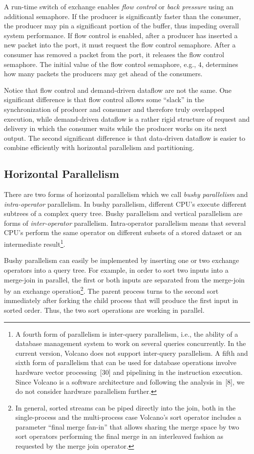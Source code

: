 \documentclass[a4paper,12pt,notitlepage,twoside,openright]{article}
\begin{document}
A run-time switch of exchange enables \emph{flow control}
or \emph{back pressure} using an additional semaphore. If the
producer is significantly faster than the consumer, the producer
may pin a significant portion of the buffer, thus impeding
overall system performance. If flow control is enabled,
after a producer has inserted a new packet into the port, it
must request the flow control semaphore. After a consumer
has removed a packet from the port, it releases the flow
control semaphore. The initial value of the flow control
semaphore, e.g., $4$, determines how many packets the
producers may get ahead of the consumers.

Notice that flow control and demand-driven dataflow
are not the same. One significant difference is that flow
control allows some ``slack'' in the synchronization of
producer and consumer and therefore truly overlapped execution,
while demand-driven dataflow is a rather rigid structure
of request and delivery in which the consumer waits
while the producer works on its next output. The second
significant difference is that data-driven dataflow is easier to
combine efficiently with horizontal parallelism and partitioning.

\subsection{Horizontal Parallelism}

There are two forms of horizontal parallelism which
we call \emph{bushy parallelism} and \emph{intra-operator} parallelism. In
bushy parallelism, different CPU's execute different subtrees
of a complex query tree. Bushy parallelism and vertical
parallelism are forms of \emph{inter-operator} parallelism. Intra-operator
parallelism means that several CPU's perform the
same operator on different subsets of a stored dataset or an
intermediate result\footnote{%
A fourth form of parallelism is inter-query parallelism,
i.e., the ability of a database management system to work on
several queries concurrently. In the current version, Volcano
does not support inter-query parallelism. A fifth and sixth form
of parallelism that can be used for database operations involve
hardware vector processing~{[30]} and pipelining in the instruction
execution. Since Volcano is a software architecture and following
the analysis in~{[8]}, we do not consider hardware parallelism further.
}.

Bushy parallelism can easily be implemented by
inserting one or two exchange operators into a query tree.
For example, in order to sort two inputs into a merge-join
in parallel, the first or both inputs are separated from the
merge-join by an exchange operation\footnote{%
In general, sorted streams can be piped directly into the
join, both in the single-process and the multi-process case
Volcano's sort operator includes a parameter ``final merge fan-in''
that allows sharing the merge space by two sort operators performing
the final merge in an interleaved fashion as requested by
the merge join operator.
}. The parent process
turns to the second sort immediately after forking the child
process that will produce the first input in sorted order.
Thus, the two sort operations are working in parallel.
\end{document}
